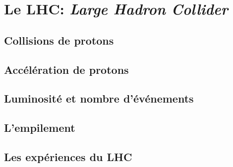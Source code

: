 \section{Le LHC: \emph{Large Hadron Collider}}

\subsection{Collisions de protons}

\subsection{Accélération de protons}

\subsection{Luminosité et nombre d'événements}

\subsection{L'empilement}

\subsection{Les expériences du LHC}